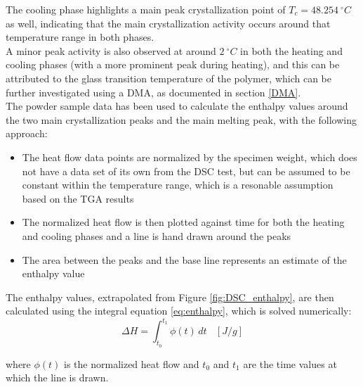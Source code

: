 \documentclass{article}
\begin{document}
        The cooling phase highlights a main peak crystallization point of $T_{c} =  48.254 \ ^{\circ}C$ as well, indicating 
        that the main crystallization activity occurs around that temperature range in both phases. \\ 

        A minor peak activity is also observed at around $2 \ ^{\circ}C$ in both the heating and cooling phases
        (with a more prominent peak during heating), and this can be attributed to the
        glass transition temperature of the polymer, which can be further investigated using a DMA, as documented in section \ref{DMA}. \\

        The powder sample data has been used to calculate the enthalpy values around the two main crystallization peaks and the main 
        melting peak, with the following approach: \\

        \begin{itemize}
            \item The heat flow data points are normalized by the specimen weight, which does not have a data set of its own from the DSC test, 
            but can be assumed to be constant within the temperature range, which is a resonable 
            assumption based on the TGA results 
            \item The normalized heat flow is then plotted against time for both the heating and cooling phases and 
            a line is hand drawn around the peaks
            \item The area between the peaks and the base line represents an estimate of the enthalpy value  
        \end{itemize}

        The enthalpy values, extrapolated from Figure \ref{fig:DSC_enthalpy}, are then calculated using the integral equation \ref{eq:enthalpy}, which is solved numerically: \\ 

        \begin{equation}
            \Delta H = \int_{t_0}^{t_1} \phi (t) \,dt \ \ \ \ [J/g]
            \label{eq:enthalpy}
        \end{equation}

        where $\phi (t)$ is the normalized heat flow and $t_0$ and $t_1$ are the time values at which the line is drawn. 

        \clearpage
\end{document}
